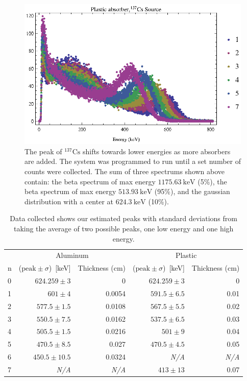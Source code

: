 \begin{figure}[tbp]
	\centering
		\includegraphics[width=\MyWidth]{Figures/plasticShiftsPlot.eps}
	\caption{The peak of $^{137}\text{Cs}$ shifts towards lower energies as more absorbers are added.  The system was programmed to run until a set number of counts were collected.  The sum of three spectrums shown above contain: the beta spectrum of max energy $1175.63~\text{keV}$ (5\%), the beta spectrum of max energy $513.93~\text{keV}$ (95\%), and the gaussian distribution with a center at $624.3~\text{keV}$ (10\%).}
	\label{fig:Figures_plasticShiftsPlot}
\end{figure}%
\begin{table}
	[tbp] 
	\begin{center}
		\begin{tabular}{lrrrr}
\toprule
 	 &  		\multicolumn{2}{c}{Aluminum} 			 & 			\multicolumn{2}{c}{Plastic} 				\\
\cmidrule(r){2-3}
\cmidrule(r){4-5}
n    & ($\text{peak}\pm\sigma$)~[keV] 	& Thickness (cm) & ($\text{peak}\pm\sigma$)~[keV] 	& Thickness (cm) 	\\
\midrule
0    & $624.259\pm3$					&	0	         &	$624.259\pm3$					&	0   			\\
1    & $601\pm4$						&	0.0054		 &	$591.5\pm6.5$					&	0.01			\\
2    & $577.5\pm1.5$					&	0.0108		 &	$567.5\pm5.5$					&	0.02			\\
3    & $550.5\pm7.5$					&	0.0162		 &	$537.5\pm6.5$					&	0.03			\\
4    & $505.5\pm1.5$					&	0.0216		 &	$501\pm9$						&	0.04			\\
5    & $470.5\pm8.5$					&	0.027	     &	$470.5\pm4.5$					&	0.05			\\
6    & $450.5\pm10.5$					&	0.0324		 &	\textit{N/A}					&	\textit{N/A}	\\
7    & 	\textit{N/A}	    			&	\textit{N/A} &	$413\pm13$						&	0.07  			\\
\bottomrule
		\end{tabular}
	\end{center}
	\caption{Data collected shows our estimated peaks with standard deviations from taking the average of two possible peaks, one low energy and one high energy.} \label{tab:dataCollected}
\end{table}%
